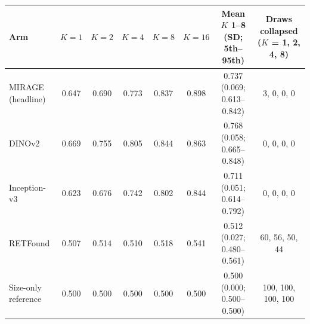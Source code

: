 \begin{tabular}{@{}lccccccc@{}}
\toprule
Arm & $K=1$ & $K=2$ & $K=4$ & $K=8$ & $K=16$ & \makecell{Mean $K$ 1--8\\(SD; 5th--95th)} & \makecell{Draws collapsed\\($K$ = 1, 2, 4, 8)} \\
\midrule
MIRAGE (headline) & 0.647 & 0.690 & 0.773 & 0.837 & 0.898 & 0.737 (0.069; 0.613--0.842) & 3, 0, 0, 0 \\
DINOv2 & 0.669 & 0.755 & 0.805 & 0.844 & 0.863 & 0.768 (0.058; 0.665--0.848) & 0, 0, 0, 0 \\
Inception-v3 & 0.623 & 0.676 & 0.742 & 0.802 & 0.844 & 0.711 (0.051; 0.614--0.792) & 0, 0, 0, 0 \\
RETFound & 0.507 & 0.514 & 0.510 & 0.518 & 0.541 & 0.512 (0.027; 0.480--0.561) & 60, 56, 50, 44 \\
Size-only reference & 0.500 & 0.500 & 0.500 & 0.500 & 0.500 & 0.500 (0.000; 0.500--0.500) & 100, 100, 100, 100 \\
\bottomrule
\end{tabular}
